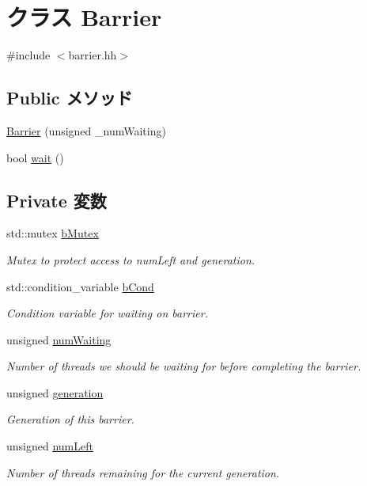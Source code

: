 \hypertarget{classBarrier}{
\section{クラス Barrier}
\label{classBarrier}
}


{\ttfamily \#include $<$barrier.hh$>$}\subsection*{Public メソッド}
\begin{DoxyCompactItemize}
\item 
\hyperlink{classBarrier_ab11eb47d1338adc267b8ccb093d33197}{Barrier} (unsigned \_\-numWaiting)
\item 
bool \hyperlink{classBarrier_ab86f338cf229c8dd15d854493ff43ff6}{wait} ()
\end{DoxyCompactItemize}
\subsection*{Private 変数}
\begin{DoxyCompactItemize}
\item 
std::mutex \hyperlink{classBarrier_a40dd1fa204ad5ba9ae7880f21ba810e1}{bMutex}
\begin{DoxyCompactList}\small\item\em Mutex to protect access to numLeft and generation. \item\end{DoxyCompactList}\item 
std::condition\_\-variable \hyperlink{classBarrier_ae060431453d3ba5ae5334759419545a1}{bCond}
\begin{DoxyCompactList}\small\item\em Condition variable for waiting on barrier. \item\end{DoxyCompactList}\item 
unsigned \hyperlink{classBarrier_a2fc1e8c1c5053f7cd70d3797d8ddbb1f}{numWaiting}
\begin{DoxyCompactList}\small\item\em Number of threads we should be waiting for before completing the barrier. \item\end{DoxyCompactList}\item 
unsigned \hyperlink{classBarrier_a9db7eb9a8410fd508ad6dc871cdc8a47}{generation}
\begin{DoxyCompactList}\small\item\em Generation of this barrier. \item\end{DoxyCompactList}\item 
unsigned \hyperlink{classBarrier_a29f3fa2b3a19d46d1524bfaa351ceeab}{numLeft}
\begin{DoxyCompactList}\small\item\em Number of threads remaining for the current generation. \item\end{DoxyCompactList}\end{DoxyCompactItemize}


